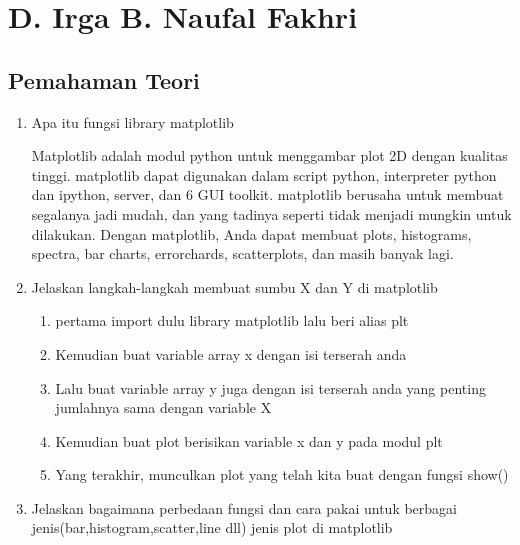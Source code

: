 \section{D. Irga B. Naufal Fakhri}
\subsection{Pemahaman Teori}
\begin{enumerate}
\item Apa itu fungsi library matplotlib

	Matplotlib adalah modul python untuk menggambar plot 2D dengan kualitas tinggi. matplotlib dapat digunakan dalam script python, interpreter python dan ipython, server, dan 6 GUI toolkit. matplotlib berusaha untuk membuat segalanya jadi mudah, dan yang tadinya seperti tidak menjadi mungkin untuk dilakukan. Dengan matplotlib, Anda dapat membuat plots, histograms, spectra, bar charts, errorchards, scatterplots, dan masih banyak lagi.

\item Jelaskan langkah-langkah membuat sumbu X dan Y di matplotlib
\begin{enumerate}
	\item pertama import dulu library matplotlib lalu beri alias plt
	
	
	\item Kemudian buat variable array x dengan isi terserah anda
	
	
	\item Lalu buat variable array y juga dengan isi terserah anda yang penting jumlahnya sama dengan variable X
	
	
	\item Kemudian buat plot berisikan variable x dan y pada modul plt
	
	
	\item Yang terakhir, munculkan plot yang telah kita buat dengan fungsi show()
	
\end{enumerate}

\item Jelaskan bagaimana perbedaan fungsi dan cara pakai untuk berbagai jenis(bar,histogram,scatter,line dll) jenis plot di matplotlib


\end{enumerate}
